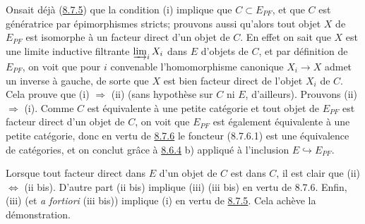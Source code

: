 \documentclass[10pt]{../fichiers-configuration-latex/smfart}
\begin{document}
On\pageoriginale sait déjà (\hyperref[I.prop8.7.5]{8.7.5}) que la condition (i)
implique que $C\subset E_{PF}$, et que $C$ est génératrice par
épimorphismes stricts; prouvons aussi qu'alors tout objet $X$ de
$E_{PF}$ est isomorphe à un facteur direct d'un objet de $C$. En
effet on sait que $X$ est une limite inductive filtrante
$\varinjlim_i X_i$ dans $E$ d'objets de $C$, et par définition de
$E_{PF}$, on voit que pour $i$ convenable l'homomorphisme canonique
$X_i\rightarrow X$ admet un inverse à gauche, de sorte que $X$ est
bien facteur direct de l'objet $X_i$ de $C$. Cela prouve que (i)
$\Rightarrow$ (ii) (sans hypothèse sur $C$ ni $E$, d'ailleurs).
Prouvons (ii) $\Rightarrow$ (i). Comme $C$ est équivalente à une
petite catégorie et tout objet de $E_{PF}$ est facteur direct d'un
objet de $C$, on voit que $E_{PF}$ est également équivalente à une
petite catégorie, donc en vertu de \hyperref[I.cor8.7.6]{8.7.6} le foncteur
(8.7.6.1) est une équivalence de catégories, et on conclut
grâce à \hyperref[I.prop8.6.4]{8.6.4} b) appliqué à l'inclusion
$E\hookrightarrow E_{PF}$.

Lorsque tout facteur direct dans $E$ d'un objet de $C$ est dans $C$,
il est clair que (ii) $\Leftrightarrow$ (ii bis). D'autre part (ii
bis) implique (iii) \resp (iii bis) en vertu de 8.7.6. Enfin, (iii)
(et \textit{a fortiori} (iii bis)) implique (i) en vertu de
\hyperref[I.prop8.7.5]{8.7.5}. Cela achève la démonstration.
\end{document}
